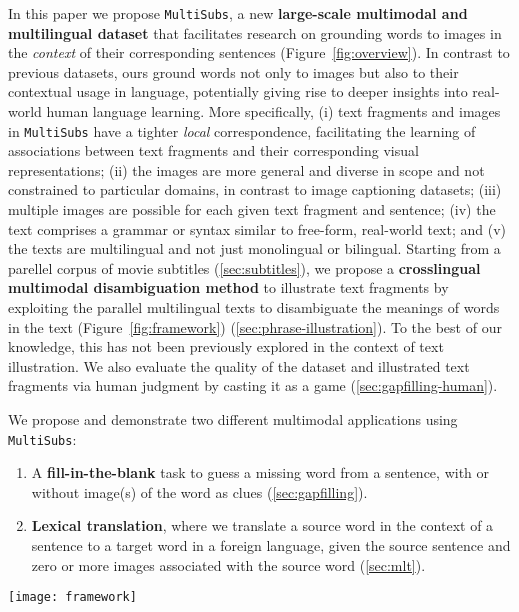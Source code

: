 \documentclass[twocolumn]{svjour3}          \smartqed  \usepackage{graphicx}
\newcommand{\multisubs}{\texttt{MultiSubs}\xspace}
\begin{document}
In this paper we propose \multisubs, a new \textbf{large-scale multimodal and multilingual dataset} that facilitates research on grounding words to images in the \emph{context} of their corresponding sentences (Figure~\ref{fig:overview}). In contrast to previous datasets, ours ground words not only to images but also to their contextual usage in language, potentially giving rise to deeper insights into real-world human language learning. More specifically, (i) text fragments and images in \multisubs have a tighter \emph{local} correspondence, facilitating the learning of associations between text fragments and their corresponding visual representations; (ii) the images are more general and diverse in scope and not constrained to particular domains, in contrast to image captioning datasets; (iii) multiple images are possible for each given text fragment and sentence; (iv) the text comprises a grammar or syntax similar to free-form, real-world text; and (v) the texts are multilingual and not just monolingual or bilingual. Starting from a parellel corpus of movie subtitles (\ref{sec:subtitles}), we propose a \textbf{crosslingual multimodal disambiguation method} to illustrate text fragments by exploiting the parallel multilingual texts to disambiguate the meanings of words in the text (Figure~\ref{fig:framework})  (\ref{sec:phrase-illustration}). To the best of our knowledge, this has not been previously explored in the context of text illustration. We also evaluate the quality of the dataset and illustrated text fragments via human judgment by casting it as a game (\ref{sec:gapfilling-human}).

We propose and demonstrate two different multimodal applications using \multisubs:
\begin{enumerate}
\item A \textbf{fill-in-the-blank} task to guess a missing word from a sentence, with or without image(s) of the word as clues (\ref{sec:gapfilling}). \item \textbf{Lexical translation}, where we translate a source word in the context of a sentence to a target word in a foreign language, given the source sentence and zero or more images associated with the source word (\ref{sec:mlt}). 
\end{enumerate}

\begin{figure*}[t]
    \centering
    \texttt{[image: framework]}
    \caption{Overview of the \multisubs construction process. Starting from parallel corpora, we selected `visually salient' English words  (\textit{weapon} and \textit{trunk} in this example). We automatically align the words across languages (e.g.\ \textit{trunk} to \textit{cajuela}, \textit{coffre} etc.), and queried BabelNet with the words to obtain a list of synsets. In this example, \textit{trunk} in English is ambiguous, but \textit{cajuela} in Spanish is not. We thus disambiguated the sense of \textit{trunk} by finding the intersection of synsets across languages (bn:00007381n), and illustrate \textit{trunk} with images associated with the intersecting synset, as provided by BabelNet.}
    \label{fig:framework}
\end{figure*}
\end{document}
